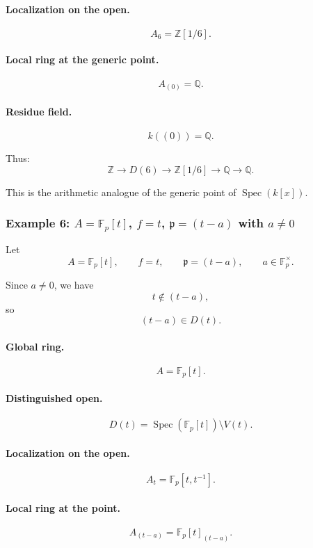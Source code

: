 \documentclass[12pt,a4paper]{article}
\theoremstyle{notespace}
\newcommand{\Spec}{\operatorname{Spec}}
\newcommand{\mf}{\mathfrak}
\theoremstyle{definition}
\begin{document}
\paragraph{Localization on the open.}
\[
A_6=\mathbb Z[1/6].
\]

\paragraph{Local ring at the generic point.}
\[
A_{(0)}=\mathbb Q.
\]

\paragraph{Residue field.}
\[
k((0))=\mathbb Q.
\]

Thus:
\[
\mathbb Z
\longrightarrow
D(6)
\longrightarrow
\mathbb Z[1/6]
\longrightarrow
\mathbb Q
\longrightarrow
\mathbb Q.
\]

This is the arithmetic analogue of the generic point of \(\Spec(k[x])\).

\subsubsection{Example 6: \(A=\mathbb F_p[t]\), \(f=t\), \(\mf p=(t-a)\) with \(a\neq 0\)}

Let
\[
A=\mathbb F_p[t],
\qquad
f=t,
\qquad
\mf p=(t-a),
\qquad
a\in \mathbb F_p^\times.
\]

Since \(a\neq 0\), we have
\[
t\notin (t-a),
\]
so
\[
(t-a)\in D(t).
\]

\paragraph{Global ring.}
\[
A=\mathbb F_p[t].
\]

\paragraph{Distinguished open.}
\[
D(t)=\Spec(\mathbb F_p[t])\setminus V(t).
\]

\paragraph{Localization on the open.}
\[
A_t=\mathbb F_p[t,t^{-1}].
\]

\paragraph{Local ring at the point.}
\[
A_{(t-a)}=\mathbb F_p[t]_{(t-a)}.
\]
\end{document}
